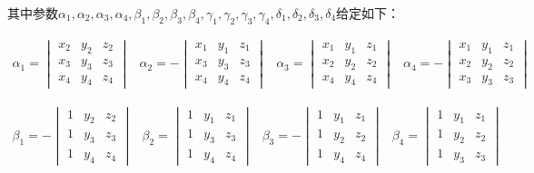 \begin{CJK*}{UTF8}{song}
其中参数$ \alpha_1, \alpha_2, \alpha_3, \alpha_4, \beta_1, \beta_2, \beta_3, \beta_4, \gamma_1, \gamma_2, \gamma_3, \gamma_4, \delta_1, \delta_2, \delta_3, \delta_4 $给定如下：

\begin{equation}
\begin{array}{cccc}
\alpha_1 = \begin{vmatrix}
x_2 & y_2 & z_2 \\ 
x_3 & y_3 & z_3 \\ 
x_4 & y_4 & z_4
\end{vmatrix} &  \alpha_2 = -\begin{vmatrix}
x_1 & y_1 & z_1 \\ 
x_3 & y_3 & z_3 \\ 
x_4 & y_4 & z_4
\end{vmatrix} & \alpha_3 = \begin{vmatrix}
x_1 & y_1 & z_1 \\ 
x_2 & y_2 & z_2 \\ 
x_4 & y_4 & z_4
\end{vmatrix} & \alpha_4 = -\begin{vmatrix}
x_1 & y_1 & z_1 \\ 
x_2 & y_2 & z_2 \\ 
x_3 & y_3 & z_3
\end{vmatrix}
\end{array} 
\end{equation}

\begin{equation}
\begin{array}{cccc}
\beta_1 = -\begin{vmatrix}
1 & y_2 & z_2 \\ 
1 & y_3 & z_3 \\ 
1 & y_4 & z_4
\end{vmatrix} &  \beta_2 = \begin{vmatrix}
1 & y_1 & z_1 \\ 
1 & y_3 & z_3 \\ 
1 & y_4 & z_4
\end{vmatrix} & \beta_3 = -\begin{vmatrix}
1 & y_1 & z_1 \\ 
1 & y_2 & z_2 \\ 
1 & y_4 & z_4
\end{vmatrix} & \beta_4 = \begin{vmatrix}
1 & y_1 & z_1 \\ 
1 & y_2 & z_2 \\ 
1 & y_3 & z_3
\end{vmatrix}
\end{array} 
\end{equation}


\end{CJK*}

